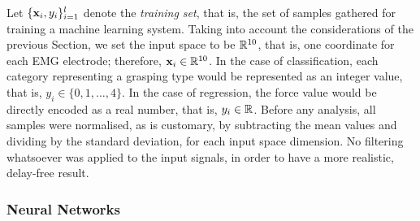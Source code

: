
Let $\{\mathbf{x}_i,y_i\}_{i=1}^l$ denote the \emph{training set}, that is,
the set of samples gathered for training a machine learning system.
Taking into account the considerations of the previous Section, we set
the input space to be $\mathbb{R}^{10}$, that is, one coordinate for each EMG
electrode; therefore, $\mathbf{x}_i \in \mathbb{R}^{10}$. In the case of
classification, each category representing a grasping type would be
represented as an integer value, that is, $y_i \in
\{0,1,\ldots,4\}$. In the case of regression, the force value would be
directly encoded as a real number, that is, $y_i \in \mathbb{R}$. Before any
analysis, all samples were normalised, as is customary, by subtracting
the mean values and dividing by the standard deviation, for each input
space dimension. No filtering whatsoever was applied to the input
signals, in order to have a more realistic, delay-free result.

\subsubsection{Neural Networks}


